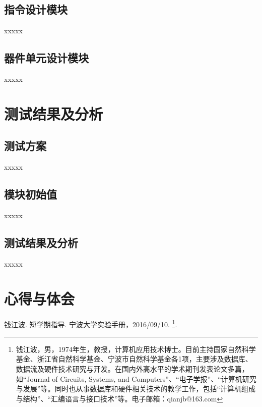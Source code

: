 \documentclass{nbueecs}
\begin{document}
\subsection{指令设计模块}
xxxxx
\subsection{器件单元设计模块}
xxxxx

\section{测试结果及分析}
\subsection{测试方案}
xxxxx
\subsection{模块初始值}
xxxxx
\subsection{测试结果及分析}
xxxxx

\section{心得与体会}

\clearpage
\setcounter{secnumdepth}{0} %
\begin{thebibliography}{99}\label{sec:bib}
\addtolength{\itemsep}{-1.5ex} %
钱江波. 短学期指导. 宁波大学实验手册，2016/09/10.
\footnote{钱江波，男，1974年生，教授，计算机应用技术博士。目前主持国家自然科学基金、浙江省自然科学基金、宁波市自然科学基金各1项，主要涉及数据库、数据流及硬件技术研究与开发。在国内外高水平的学术期刊发表论文多篇，如“Journal of Circuits, Systems, and Computers”、“电子学报”、“计算机研究与发展”等。同时也从事数据库和硬件相关技术的教学工作，包括“计算机组成与结构”、“汇编语言与接口技术”等。电子邮箱：qianjb@163.com}.
\end{thebibliography}
\end{document}
